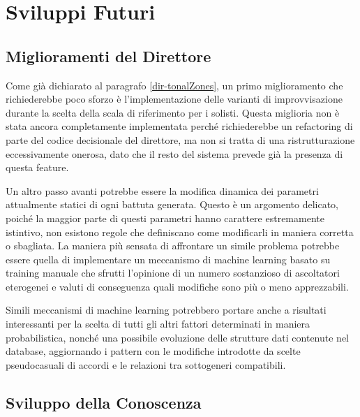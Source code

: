 \section{Sviluppi Futuri}
\subsection{Miglioramenti del Direttore}
Come già dichiarato al paragrafo \ref{dir-tonalZones}, un primo miglioramento che richiederebbe poco sforzo è l'implementazione delle varianti di improvvisazione durante la scelta della scala di riferimento per i solisti. Questa miglioria non è stata ancora completamente implementata perché richiederebbe un refactoring di parte del codice decisionale del direttore, ma non si tratta di una ristrutturazione eccessivamente onerosa, dato che il resto del sistema prevede già la presenza di questa feature.

Un altro passo avanti potrebbe essere la modifica dinamica dei parametri attualmente statici di ogni battuta generata. Questo è un argomento delicato, poiché la maggior parte di questi parametri hanno carattere estremamente istintivo, non esistono regole che definiscano come modificarli in maniera corretta o sbagliata.
La maniera più sensata di affrontare un simile problema potrebbe essere quella di implementare un meccanismo di machine learning basato su training manuale che sfrutti l'opinione di un numero sostanzioso di ascoltatori eterogenei e valuti di conseguenza quali modifiche sono più o meno apprezzabili.

Simili meccanismi di machine learning potrebbero portare anche a risultati interessanti per la scelta di tutti gli altri fattori determinati in maniera probabilistica, nonché una possibile evoluzione delle strutture dati contenute nel database, aggiornando i pattern con le modifiche introdotte da scelte pseudocasuali di accordi e le relazioni tra sottogeneri compatibili.

\subsection{Sviluppo della Conoscenza}

